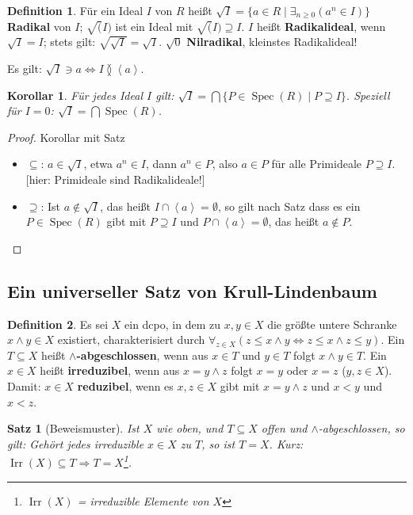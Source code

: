 \documentclass[headsepline=true,DIV=11]{scrartcl}
\newtheorem*{theorem}{Satz}
\newtheorem*{corollary}{Korollar}
\theoremstyle{definition}
\newtheorem*{definition}{Definition}
\newcommand{\Spec}{\operatorname{Spec}}
\newcommand{\Irr}{\operatorname{Irr}}
\begin{document}
\begin{definition}
  Für ein Ideal $I$ von $R$ heißt $\sqrt{I}=\{a\in R\mid\exists_{n\ge 0}(a^n\in I)\}$ {\bf Radikal} von $I$; $\sqrt(I)$ ist ein Ideal mit
  $\sqrt(I)\supseteq I$. $I$ heißt {\bf Radikalideal}, wenn $\sqrt{I}=I$; stets gilt: $\sqrt{\sqrt{I}}=\sqrt{I}$. $\sqrt{0}$ {\bf Nilradikal},
  kleinstes Radikalideal!
\end{definition}

Es gilt: $\sqrt{I}\ni a \Leftrightarrow I\between\left<a\right>$.

\begin{corollary}
  Für jedes Ideal $I$ gilt: $\sqrt{I}=\bigcap\{P\in\Spec(R)\mid P\supseteq I\}$. Speziell für $I=0$: $\sqrt{I}=\bigcap\Spec(R)$.
\end{corollary}

\begin{proof}{Korollar mit Satz}
  \begin{itemize}
    \item $\subseteq$: $a\in\sqrt{I}$, etwa $a^n\in I$, dann $a^n\in P$, also $a\in P$ für alle Primideale $P\supseteq I$. [hier: Primideale sind
      Radikalideale!]
    \item $\supseteq$: Ist $a\not\in\sqrt{I}$, das heißt $I\cap\left<a\right>=\emptyset$, so gilt nach Satz dass es ein $P\in\Spec(R)$ gibt mit
      $P\supseteq I$ und $P\cap\left<a\right>=\emptyset$, das heißt $a\not\in P$.
  \end{itemize}
\end{proof}

\subsection{Ein universeller Satz von Krull-Lindenbaum}

\begin{definition}
  Es sei $X$ ein dcpo, in dem zu $x,y\in X$ die größte untere Schranke $x\wedge y\in X$ existiert, charakterisiert durch $\forall_{z\in X}(z\le
  x\wedge y\Leftrightarrow z\le x\wedge z\le y)$. Ein $T\subseteq X$ heißt {\bf $\wedge$-abgeschlossen}, wenn aus $x\in T$ und $y\in T$ folgt $x\wedge
  y\in T$. Ein $x\in X$ heißt {\bf irreduzibel}, wenn aus $x=y\wedge z$ folgt $x=y$ oder $x=z$ ($y,z\in X$). Damit: $x\in X$ {\bf reduzibel}, wenn es
  $x,z\in X$ gibt mit $x=y\wedge z$ und $x<y$ und $x<z$.
\end{definition}

\begin{theorem}[Beweismuster]
  Ist $X$ wie oben, und $T\subseteq X$ offen und $\wedge$-abgeschlossen, so gilt: Gehört jedes irreduzible $x\in X$ zu $T$, so ist $T=X$. Kurz:
  $\Irr(X)\subseteq T\Rightarrow T=X$\footnote{$\Irr(X)$ = irreduzible Elemente von $X$}.
\end{theorem}
\end{document}
